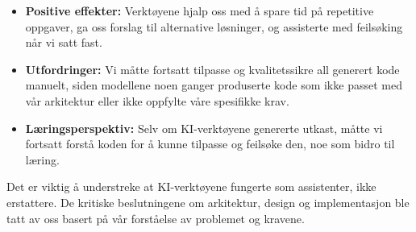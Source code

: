 \begin{itemize}
    \item \textbf{Positive effekter:} Verktøyene hjalp oss med å spare tid på repetitive oppgaver, ga oss forslag til alternative løsninger, og assisterte med feilsøking når vi satt fast.
    
    \item \textbf{Utfordringer:} Vi måtte fortsatt tilpasse og kvalitetssikre all generert kode manuelt, siden modellene noen ganger produserte kode som ikke passet med vår arkitektur eller ikke oppfylte våre spesifikke krav.
    
    \item \textbf{Læringsperspektiv:} Selv om KI-verktøyene genererte utkast, måtte vi fortsatt forstå koden for å kunne tilpasse og feilsøke den, noe som bidro til læring.
\end{itemize}

Det er viktig å understreke at KI-verktøyene fungerte som assistenter, ikke erstattere. De kritiske beslutningene om arkitektur, design og implementasjon ble tatt av oss basert på vår forståelse av problemet og kravene.
